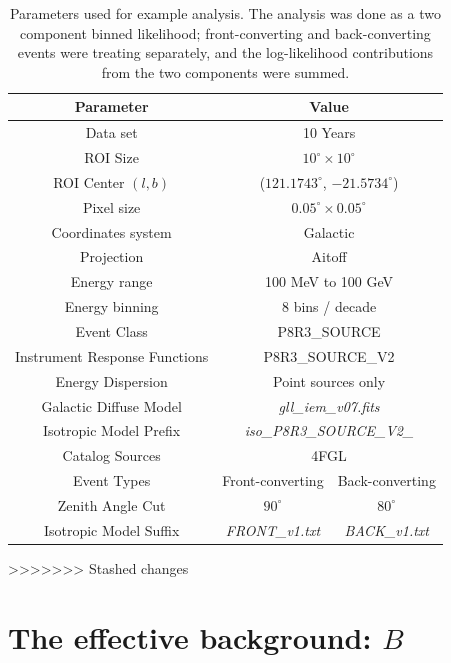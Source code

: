 \documentclass[preprint]{aastex}
\begin{document}
\begin{table}[!ht]
\begin{centering}
\begin{tabular}{cc|c}
Parameter & \multicolumn{2}{c}{Value} \\ \hline\hline
Data set & \multicolumn{2}{c}{10 Years} \\
ROI Size & \multicolumn{2}{c}{$10^\circ \times 10^\circ$} \\
ROI Center $(l,b)$ & \multicolumn{2}{c}{($121.1743^\circ$, $-21.5734^\circ$)} \\
Pixel size & \multicolumn{2}{c}{$0.05^\circ \times 0.05^\circ$} \\
Coordinates system  & \multicolumn{2}{c}{Galactic} \\
Projection & \multicolumn{2}{c}{Aitoff} \\
Energy range & \multicolumn{2}{c}{100 MeV to 100 GeV} \\
Energy binning & \multicolumn{2}{c}{8 bins / decade} \\
Event Class & \multicolumn{2}{c}{P8R3\_SOURCE} \\
Instrument Response Functions & \multicolumn{2}{c}{P8R3\_SOURCE\_V2} \\
Energy Dispersion & \multicolumn{2}{c}{Point sources only} \\
Galactic Diffuse Model & \multicolumn{2}{c}{{\it gll\_iem\_v07.fits}} \\
Isotropic Model Prefix & \multicolumn{2}{c}{{\it iso\_P8R3\_SOURCE\_V2\_}} \\
Catalog Sources  & \multicolumn{2}{c}{4FGL} \\ \hline
Event Types & Front-converting & Back-converting \\
Zenith Angle Cut & $90^\circ$ & $80^\circ$ \\
Isotropic Model Suffix & {\it FRONT\_v1.txt} & {\it BACK\_v1.txt} \\
\end{tabular}
\caption{Parameters used for example analysis.  The analysis was done as a two
  component binned likelihood; front-converting and back-converting 
  events were treating separately, and the log-likelihood contributions from the two
  components were summed.}
\label{tab:analysis_params}
\end{centering}
\end{table}
>>>>>>> Stashed changes


\section{The effective background: \texorpdfstring{$B$}{B}}
\end{document}

